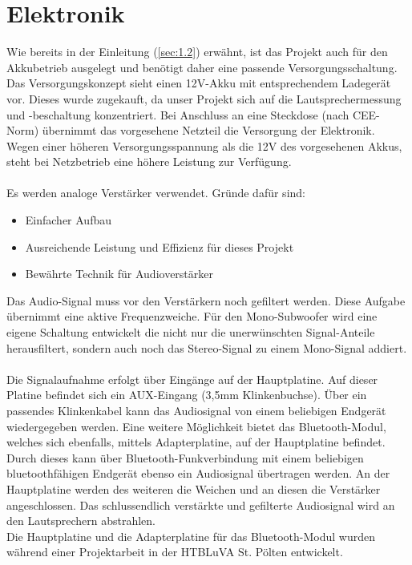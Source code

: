 \section{Elektronik}\label{subsec:2.1.1}
Wie bereits in der Einleitung (\ref{sec:1.2}) erwähnt, ist das Projekt auch für den Akkubetrieb ausgelegt und benötigt daher eine passende Versorgungsschaltung.
Das Versorgungskonzept sieht einen 12V-Akku mit entsprechendem Ladegerät vor.
Dieses wurde zugekauft, da unser Projekt sich auf die Lautsprechermessung und -beschaltung konzentriert.
Bei Anschluss an eine Steckdose (nach CEE-Norm) übernimmt das vorgesehene Netzteil die Versorgung der Elektronik.
Wegen einer höheren Versorgungsspannung als die 12V des vorgesehenen Akkus, steht bei Netzbetrieb eine höhere Leistung zur Verfügung. \\ \\
Es werden analoge Verstärker verwendet.
Gründe dafür sind:
\begin{itemize}
	\item Einfacher Aufbau
	\item Ausreichende Leistung und Effizienz für dieses Projekt
	\item Bewährte Technik für Audioverstärker
\end{itemize} 
Das Audio-Signal muss vor den Verstärkern noch gefiltert werden.
Diese Aufgabe übernimmt eine aktive Frequenzweiche.
Für den Mono-Subwoofer wird eine eigene Schaltung entwickelt die nicht nur die unerwünschten Signal-Anteile herausfiltert, sondern auch noch das Stereo-Signal zu einem Mono-Signal addiert.\\ \\
Die Signalaufnahme erfolgt über Eingänge auf der Hauptplatine.
Auf dieser Platine befindet sich ein AUX-Eingang (3,5mm Klinkenbuchse).
Über ein passendes Klinkenkabel kann das Audiosignal von einem beliebigen Endgerät wiedergegeben werden.
Eine weitere Möglichkeit bietet das Bluetooth-Modul, welches sich ebenfalls, mittels Adapterplatine, auf der Hauptplatine befindet.
Durch dieses kann über Bluetooth-Funkverbindung mit einem beliebigen bluetoothfähigen Endgerät ebenso ein Audiosignal übertragen werden.
An der Hauptplatine werden des weiteren die Weichen und an diesen die Verstärker angeschlossen. 
Das schlussendlich verstärkte und gefilterte Audiosignal wird an den Lautsprechern abstrahlen.\\
Die Hauptplatine und die Adapterplatine für das Bluetooth-Modul wurden während einer Projektarbeit in der HTBLuVA St. Pölten entwickelt.

